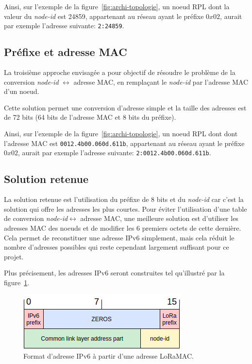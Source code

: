     Ainsi, sur l'exemple de la figure~\ref{fig:archi-topologie}, un noeud RPL dont la valeur du \textit{node-id} est 24859, appartenant au réseau ayant le préfixe $0x02$, aurait par exemple l'adresse suivante: \texttt{2:24859}.


\subsection*{Préfixe et adresse MAC}
    La troisième approche envisagée a pour objectif de résoudre le problème de la conversion \textit{node-id} $\leftrightarrow	$ adresse MAC, en remplaçant le \textit{node-id} par l'adresse MAC d'un noeud.

    Cette solution permet une conversion d'adresse simple et la taille des adresses est de 72 bits (64 bits de l'adresse MAC et 8 bits du préfixe).

    Ainsi, sur l'exemple de la figure~\ref{fig:archi-topologie}, un noeud RPL dont dont l'adresse MAC est \texttt{0012.4b00.060d.611b}, appartenant au réseau ayant le préfixe $0x02$, aurait par exemple l'adresse suivante: \texttt{2:0012.4b00.060d.611b}.

\subsection*{Solution retenue}
    La solution retenue est l'utilisation du préfixe de 8 bits et du \textit{node-id} car c'est la solution qui offre les adresses les plus courtes.    
    Pour éviter l'utilisation d'une table de conversion \textit{node-id}$\leftrightarrow$ adresse MAC, une meilleure solution est d'utiliser les adresses MAC des noeuds et de modifier les 6 premiers octets de cette dernière. Cela permet de reconstituer une adresse IPv6 simplement, mais cela réduit le nombre d'adresses possibles qui reste cependant largement suffisant pour ce projet.

    Plus précisement, les adresses IPv6 seront construites tel qu'illustré par la figure~\ref{fig:archi-address}.

    \begin{figure}[H]
        \centering
        \includegraphics[scale=0.6]{res/pictures/loraaddr-ipv6.drawio.png}
        \caption{Format d'adresse IPv6 à partir d'une adresse LoRaMAC.}
        \label{fig:archi-address}
    \end{figure}
    
